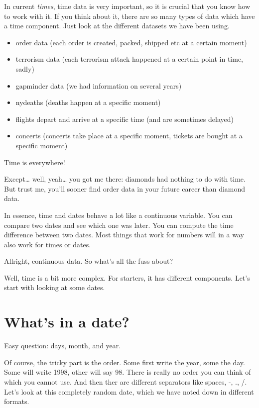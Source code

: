 \documentclass[]{tufte-book}
\providecommand{\tightlist}{%
  \setlength{\itemsep}{0pt}\setlength{\parskip}{0pt}}
\begin{document}
In current \emph{times}, time data is very important, so it is crucial that you know how to work with it. If you think about it, there are so many types of data which have a time component. Just look at the different datasets we have been using.

\begin{itemize}
\tightlist
\item
  order data (each order is created, packed, shipped etc at a certain moment)
\item
  terrorism data (each terrorism attack happened at a certain point in time, sadly)
\item
  gapminder data (we had information on several years)
\item
  nydeaths (deaths happen at a specific moment)
\item
  flights depart and arrive at a specific time (and are sometimes delayed)
\item
  concerts (concerts take place at a specific moment, tickets are bought at a specific moment)
\end{itemize}

Time is everywhere!

Except\ldots{} well, yeah\ldots{} you got me there: diamonds had nothing to do with time. But trust me, you'll sooner find order data in your future career than diamond data.

In essence, time and dates behave a lot like a continuous variable. You can compare two dates and see which one was later. You can compute the time difference between two dates. Most things that work for numbers will in a way also work for times or dates.

Allright, continuous data. So what's all the fuss about?

Well, time is a bit more complex. For starters, it has different components. Let's start with looking at some dates.

\hypertarget{whats-in-a-date}{%
\section{What's in a date?}\label{whats-in-a-date}}

Easy question: days, month, and year.

Of course, the tricky part is the order. Some first write the year, some the day. Some will write 1998, other will say 98. There is really no order you can think of which you cannot use. And then ther are different separators like spaces, -, ., /. Let's look at this completely random date, which we have noted down in different formats.
\end{document}
